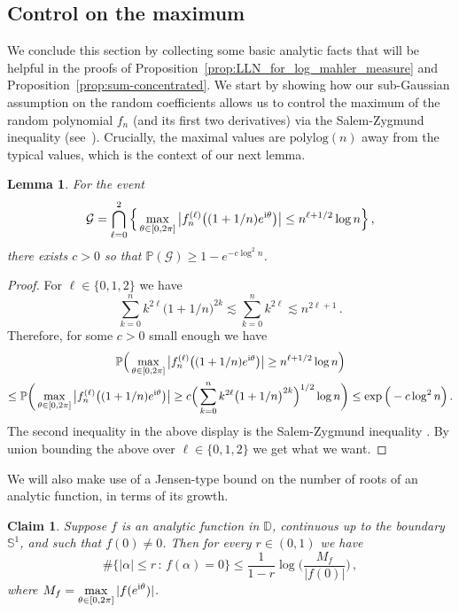 \documentclass[11pt]{amsart}
\newtheorem{lemma}[theorem]{Lemma}
\newtheorem{claim}[theorem]{Claim}
\theoremstyle{remark}
\theoremstyle{definition}
\newcommand{\bD}{\mathbb D}
\newcommand{\bP}{\mathbb P}
\newcommand{\bS}{\mathbb S}
\renewcommand{\P}{\mathbb P}
\newcommand{\cG}{\mathcal G}
\newcommand{\polylog}{\mathrm{polylog}}
\newcommand{\I}{{\rm i}}
\begin{document}
    \subsection{Control on the maximum}
    We conclude this section by collecting some basic analytic facts that will be helpful in the proofs of Proposition~\ref{prop:LLN_for_log_mahler_measure} and Proposition~\ref{prop:sum-concentrated}. We start by showing how our sub-Gaussian assumption on the random coefficients allows us to control the maximum of the random polynomial $f_n$ (and its first two derivatives) via the Salem-Zygmund inequality (see~\cite[Chapter~6]{Kahane}). Crucially, the maximal values are $\polylog(n)$ away from the typical values, which is the context of our next lemma. 
   
    \begin{lemma} \label{lemma:Salem-Zygmund}
    For the event
     \begin{equation} \label{eq:G-def}
    \mathcal{G} = \bigcap_{\ell=0}^{2} \Big\{ \max_{\theta\in[0,2\pi]} \big|f_n^{(\ell)}\big((1+1/n) e^{\I \theta}\big)\big| \le n^{\ell + 1/2} \log n\Big\}  \, ,
    \end{equation}
    there exists $c>0$ so that $\P(\cG) \ge 1 -  e^{-c\log^2 n}$.
    \end{lemma}
    \begin{proof}
        For $\ell\in\{0,1,2\}$ we have 
        \[
        \sum_{k=0}^{n} k^{2\ell} \big(1+1/n\big)^{2k} \lesssim \sum_{k=0}^{n} k^{2\ell} \lesssim n^{2\ell + 1} \, . 
        \]
        Therefore, for some $c>0$ small enough we have 
        \begin{multline*}
            \bP\Big(\max_{\theta\in[0,2\pi]} \big|f_n^{(\ell)}\big((1+1/n) e^{\I \theta}\big)\big| \ge n^{\ell + 1/2} \log n\Big) \\ \le \bP\bigg(\max_{\theta\in[0,2\pi]} \big|f_n^{(\ell)}\big((1+1/n) e^{\I \theta}\big)\big| \ge c \Big(\sum_{k=0}^{n} k^{2\ell} \big(1+1/n\big)^{2k}\Big)^{1/2} \log n\bigg) \le \exp\Big(-c\log^2n \Big) \, .
        \end{multline*}
        The second inequality in the above display is the Salem-Zygmund inequality \cite[Chapter~6, Theorem~1]{Kahane}. By union bounding the above over $\ell \in \{0,1,2 \}$ we get what we want.  
    \end{proof}
    We will also make use of a Jensen-type bound on the number of roots of an analytic function, in terms of its growth.
    \begin{claim}\label{claim:Jensen_bound_on_number_of_roots}
    Suppose $f$ is an analytic function in $\bD$, continuous up to the boundary $\bS^1$, and such that $f(0)\not=0$. Then for every $r \in (0,1)$ we have
    \begin{equation*}
        \#\big\{|\alpha|\le r \, : \, f(\alpha) = 0\big\} \le \frac{1}{1-r}\log\Big(\frac{M_f}{|f(0)|}\Big) \, ,
    \end{equation*}
    where $M_f = \displaystyle \max_{\theta \in [0,2\pi]}|f(e^{\I\theta})|$.
    \end{claim}
\end{document}
